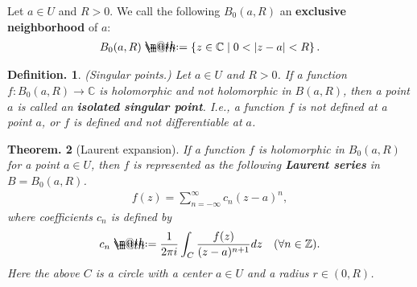 \documentclass[openany, a4paper, oneside]{jsbook}
\makeatletter
\newcommand*{\defeq}{\mathrel{\rlap{%
\raisebox{0.3ex}{$\m@th\cdot$}}%
\raisebox{-0.3ex}{$\m@th\cdot$}}%
=}
\theoremstyle{break}
\newtheorem{thm}{Theorem.}[section]
\theoremstyle{breakdefn}
\newtheorem{defn}[thm]{Definition.}
\newcommand{\abs}[1]{\left|#1\right|}
\newcommand{\relmiddle}[1]{\mathrel{}\middle#1\mathrel{}}
\newcommand{\set}[2]{\left\{#1 \relmiddle| #2\right\}}
\newcommand{\bbC}{\mathbb{C}}
\newcommand{\bbZ}{\mathbb{Z}}
\newcommand{\upbf}[1]{\textup{\textbf{#1}}}
\makeatother
\begin{document}
Let $a \in U$ and $R > 0$.
We call the following $B_0 (a, R)$ an \textbf{exclusive neighborhood} of $a$:
\begin{align}
 B_0 (a, R)
 \defeq
 \set{z \in \bbC}{ 0 < \abs{z - a} < R}.
\end{align}
\begin{defn}\textup{(Singular points.)}
 Let $a \in U$ and $R > 0$.
 If a function $f \colon B_0 (a, R) \to \bbC$ is holomorphic and not holomorphic in $B (a, R)$,
 then a point $a$ is called an \upbf{isolated singular point}.
 I.e., a function $f$ is not defined at a point $a$, or $f$ is defined and not differentiable at $a$.
\end{defn}
\begin{thm}[Laurent expansion]
 If a function $f$ is holomorphic in $B_0 (a, R)$ for a point $a \in U$, then
 $f$ is represented as the following \upbf{Laurent series} in $B = B_0 (a, R)$.
 \begin{align}
  f (z)
  =
  \sum_{n= - \infty}^{\infty} c_n (z-a)^n,
 \end{align}
 where coefficients $c_n$ is defined by
 \begin{align}
  c_n
  \defeq
  \frac{1}{2 \pi i} \int_C \frac{f (z)}{(z - a)^{n+1}} dz \quad (\forall n \in \bbZ).
 \end{align}
 Here the above $C$ is a circle with a center $a \in U$ and a radius $r \in (0, R)$.
\end{thm}
\end{document}
